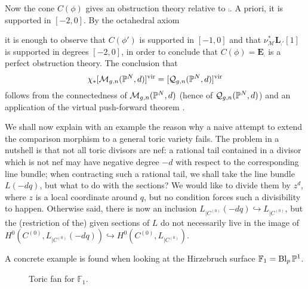 Now the cone $C(\phi)$ gives an obstruction theory relative to $\comp$. A priori, it is supported in $[-2,0]$. By the octahedral axiom
\begin{center}
\end{center}
it is enough to observe that $C(\phi')$ is supported in $[-1,0]$ \cite[Lemma 4.20]{Manolache-Push} and that $\nu_{\mathcal M}^*\mathbf L_{\comp'}{[1]}$ is supported in degrees $[-2,0]$, in order to conclude that $C(\phi)=\mathbf E_{\comp}$ is a perfect obstruction theory. The conclusion that
\[
 \chi_*[\mathcal{M}_{g,n}(\mathbb P^N,d)]^{\text{vir}}=[\mathcal{Q}_{g,n}(\mathbb P^N,d)]^{\text{vir}}
\]
follows from the connectedness of $\mathcal{M}_{g,n}(\mathbb P^N,d)$ \cite{KP} (hence of $\mathcal{Q}_{g,n}(\mathbb P^N,d)$) and an application of the virtual push-forward theorem \cite[Proposition 4.21]{Manolache-Push}.

We shall now explain with an example the reason why a naive attempt to extend the comparison morphism to a general toric variety fails. The problem in a nutshell is that not all toric divisors are nef: a rational tail contained in a divisor which is not nef may have negative degree $-d$ with respect to the corresponding line bundle; when contracting such a rational tail, we shall take the line bundle $L(-dq)$, but what to do with the sections? We would like to divide them by $z^d$, where $z$ is a local coordinate around $q$, but no condition forces such a divisibility to happen. Otherwise said, there is now an inclusion $L_{|C^{(0)}}(-dq)\hookrightarrow L_{|C^{(0)}}$, but the (restriction of the) given sections of $L$ do not necessarily live in the image of $H^0(C^{(0)},L_{|C^{(0)}}(-dq))\hookrightarrow H^0(C^{(0)},L_{|C^{(0)}})$.

A concrete example is found when looking at the Hirzebruch surface $\mathbb F_1=\operatorname{Bl}_{p}\mathbb P^1$.
\begin{figure}
\caption{Toric fan for $\mathbb F_1$.}
\end{figure}

